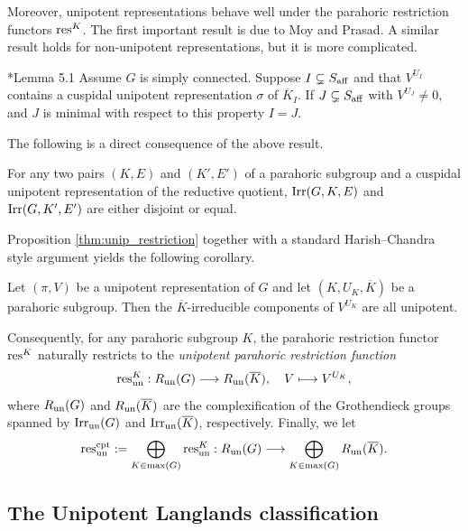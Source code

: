 Moreover, unipotent representations behave well under the parahoric restriction functors $\mathrm{res}^K$. The first important result is due to Moy and Prasad. A similar result holds for non-unipotent representations, but it is more complicated. 
\begin{proposition}\label{thm:unip_restriction}\cite{Reeder2000}*{Lemma 5.1}
    Assume $G$ is simply connected. Suppose $I\subsetneq S_{\mathrm{aff}}$ and that $V^{U_I}$ contains a cuspidal unipotent representation $\sigma$ of $\overline{K}_I$. If $J\subsetneq S_{\mathrm{aff}}$ with $V^{U_J}\neq 0$, and $J$ is minimal with respect to this property $I=J$.
\end{proposition}
The following is a direct consequence of the above result.
\begin{cor}\label{cor:unipotentblock_disjoint}
    For any two pairs $(K,E)$ and $(K',E')$ of a parahoric subgroup and a cuspidal unipotent representation of the reductive quotient, $\mathrm{Irr}(G,K,E)$ and $\mathrm{Irr}(G,K',E')$ are either disjoint or equal.
\end{cor}
Proposition \ref{thm:unip_restriction} together with a standard Harish--Chandra style argument yields the following corollary.
\begin{cor}
    Let $(\pi,V)$ be a unipotent representation of $G$ and let $(K,U_K,\overline{K})$ be a parahoric subgroup. Then the $\overline{K}$-irreducible components of $V^{U_K}$ are all unipotent.
\end{cor}

Consequently, for any parahoric subgroup $K$, the parahoric restriction functor $\mathrm{res}^K$ naturally restricts to the \textit{unipotent parahoric restriction function}
\begin{equation*}
    \mathrm{res}^K_{\mathrm{un}}:R_{\mathrm{un}}(G)\longrightarrow R_{\mathrm{un}}(\overline{K}),\quad V\longmapsto V^{U_K},
\end{equation*}
where $R_{\mathrm{un}}(G)$ and $R_{\mathrm{un}}(\overline{K})$ are the complexification of the Grothendieck groups spanned by $\mathrm{Irr}_{\mathrm{un}}(G)$ and $\mathrm{Irr}_{\mathrm{un}}(\overline{K})$, respectively. Finally, we let
$$\mathrm{res}^{\mathrm{cpt}}_{\mathrm{un}}:=\bigoplus_{K\in\max(G)}\mathrm{res}^K_{\mathrm{un}}:R_{\mathrm{un}}(G)\longrightarrow \bigoplus_{K\in\max(G)}R_{\mathrm{un}}(\overline{K}).$$

\subsection{The Unipotent Langlands classification}\label{subsec:ULLC}

